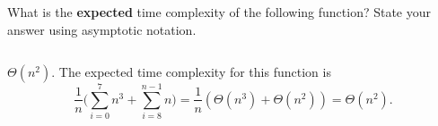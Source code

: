 \begin{prob}
    What is the \textbf{expected} time complexity of the following function?
    State your answer using asymptotic notation.

    \inputminted{python}{./code.py}

    \begin{soln}
        $\Theta(n^2)$. The expected time complexity for this function is 
        \[ \frac{1}{n} \bigg( \sum_{i = 0}^{7} n^3 + \sum_{i = 8}^{n - 1} n \bigg) = \frac{1}{n} (\Theta(n^3) + \Theta(n^2)) = \Theta(n^2). \]
    \end{soln}

\end{prob}
